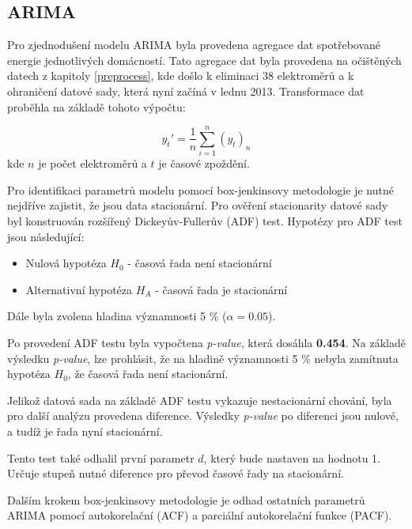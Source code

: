\documentclass[FM,BP,fonts]{tulthesis}
\begin{document}
\subsection{ARIMA}

Pro zjednodušení modelu ARIMA byla provedena agregace dat spotřebované energie jednotlivých domácností. Tato agregace dat byla provedena na očištěných datech z kapitoly \ref{preprocess}, kde došlo k eliminaci 38 elektroměrů a k ohraničení datové sady, která nyní začíná v lednu 2013. Transformace dat proběhla na základě tohoto výpočtu:

\begin{equation}
	y_t' = \frac{1}{n}\sum_{i=1}^{n}(y_t)_n
\end{equation}
kde $n$ je počet elektroměrů a $t$ je časové zpoždění.

Pro identifikaci parametrů modelu pomocí box-jenkinsovy metodologie je nutné nejdříve zajistit, že jsou data stacionární. \cite{zayiong} Pro ověření stacionarity datové sady byl konstruován rozšířený Dickeyův-Fullerův (ADF) test. Hypotézy pro ADF test jsou následující:
\begin{itemize}
\item Nulová hypotéza $H_0$ - časová řada není stacionární
\item Alternativní hypotéza $H_A$ - časová řada je stacionární
\end{itemize}
Dále byla zvolena hladina významnosti 5 \% ($\alpha=0.05$).

Po provedení ADF testu byla vypočtena \textit{p-value}, která dosáhla \textbf{0.454}. Na základě výsledku \textit{p-value}, lze prohlásit, že na hladině významnosti 5 \% nebyla zamítnuta hypotéza $H_0$, že časová řada není stacionární.

Jelikož datová sada na základě ADF testu vykazuje nestacionární chování, byla pro další analýzu provedena diference. Výsledky \textit{p-value} po diferenci jsou nulové, a tudíž je řada nyní stacionární.

Tento test také odhalil první parametr $d$, který bude nastaven na hodnotu 1. Určuje stupeň nutné diference pro převod časové řady na stacionární.

Dalším krokem box-jenkinsovy metodologie je odhad ostatních parametrů ARIMA pomocí autokorelační (ACF) a parciální autokorelační funkce (PACF).
\end{document}

